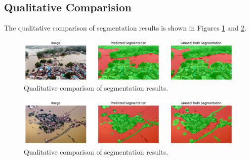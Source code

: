 \subsection{Qualitative Comparision}
The qualitative comparison of segmentation results is shown in Figures \ref{fig:results} and \ref{fig:results2}.
\begin{figure}[t]
    \centering
     \includegraphics[width=0.9\linewidth]{images/maskformer_1_after.png}
  
     \caption{Qualitative comparison of segmentation results.}
     \label{fig:results}
\end{figure}

\begin{figure}[t]
    \centering
     \includegraphics[width=0.9\linewidth]{images/maskformer_2_after.png}
  
     \caption{Qualitative comparison of segmentation results.}
     \label{fig:results2}
\end{figure}